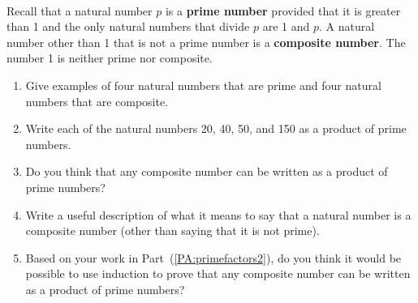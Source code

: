 \begin{previewactivity} \label{PA:primefactors} \hfill \\
Recall that a natural number  $p$  is  a \textbf{prime number}
%
 provided that it is greater than 1 and the only natural numbers that divide  $p$  are  1  and  $p$.  A natural number other than 1 that is not a prime number is a \textbf{composite number}.
%
  The number 1 is neither prime nor composite.
\begin{enumerate}
\item Give examples of four natural numbers that are prime and four natural numbers that are composite.

\item Write each of the natural numbers  20, 40, 50, and 150  as a product of prime numbers.  \label{PA:primefactors2}


\item Do you think that any composite number can be written as a product of prime numbers?

\item Write a useful description of what it means to say that a natural number is a composite number (other than saying that it is not prime).

\item Based on your work in Part~(\ref{PA:primefactors2}), do you think it would be possible to use induction to prove that any composite number can be written as a product of prime numbers?
\end{enumerate}
\end{previewactivity}
\hbreak

\endinput
